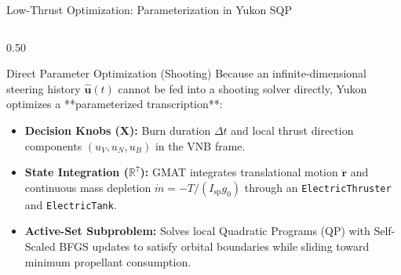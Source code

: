 \documentclass[aspectratio=169, 10pt]{beamer}
\begin{document}
\begin{frame}{Low-Thrust Optimization: Parameterization in Yukon SQP}
    \begin{columns}[T]
        \begin{column}{0.50\textwidth}
            \begin{block}{Direct Parameter Optimization (Shooting)}
                \scriptsize
                Because an infinite-dimensional steering history $\hat{\mathbf{u}}(t)$ cannot be fed into a shooting solver directly, Yukon optimizes a **parameterized transcription**:
                \begin{itemize}\setlength{\itemsep}{1.5pt}\setlength{\topsep}{0pt}
                    \item \textbf{Decision Knobs ($\mathbf{X}$):} Burn duration $\Delta t$ and local thrust direction components $(u_V, u_N, u_B)$ in the VNB frame.
                    \item \textbf{State Integration ($\mathbb{R}^7$):} GMAT integrates translational motion $\ddot{\mathbf{r}}$ and continuous mass depletion $\dot{m} = -T / (I_{\text{sp}} g_0)$ through an \texttt{ElectricThruster} and \texttt{ElectricTank}.
                    \item \textbf{Active-Set Subproblem:} Solves local Quadratic Programs (QP) with Self-Scaled BFGS updates to satisfy orbital boundaries while sliding toward minimum propellant consumption.
                \end{itemize}
            \end{block}
        \end{column}


\end{columns}
\end{frame}
\end{document}

